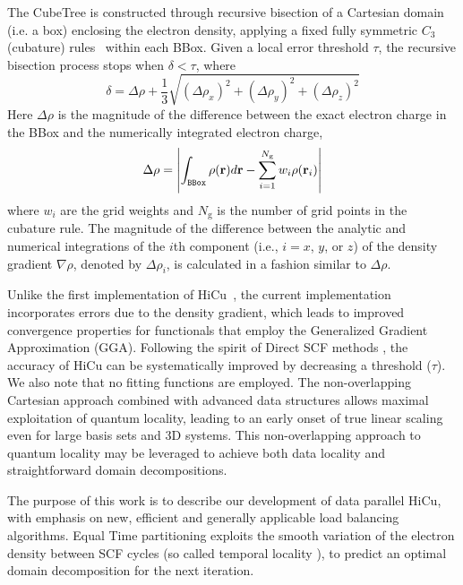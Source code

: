\commentoutA{\documentclass[prb,aps,twocolumn,twocolumngrid]{revtex4}}
\begin{document}
The CubeTree is constructed through recursive bisection of a Cartesian
domain (i.e. a box) enclosing the electron density, applying a fixed
fully symmetric $C_3$ (cubature) rules~\cite{Stroud71} within each
BBox.  Given a local error threshold $\tau$, the recursive bisection
process stops when $\delta < \tau$, where
\begin{equation}
\delta = \Delta \rho+ \frac{1}{3} \sqrt{(\Delta \rho_x)^2 + (\Delta
\rho_y)^2 + (\Delta \rho_z)^2}
\label{eq:delta}
\end{equation}
Here $\Delta \rho$ is the magnitude of the difference between the
exact electron charge in the BBox and the numerically integrated
electron charge,
\begin{equation}
\Delta \rho = \left|\int_{\tt{BBox}}\rho({\bf r}) d{\bf r} -
\sum_{i=1}^{N_{\mathrm{g}}} w_i\rho({\bf r}_i)\right|
\end{equation}
where $w_i$ are the grid weights and $N_{\mathrm{g}}$ is the number of
grid points in the cubature rule. The magnitude of the difference
between the analytic and numerical integrations of the $i$th component
(i.e., $i = x$, $y$, or $z$) of the density gradient $\nabla \rho$,
denoted by $\Delta \rho_i $, is calculated in a fashion similar to
$\Delta \rho$.

Unlike the first implementation of HiCu~\cite{MChallacombe00A}, the
current implementation incorporates errors due to the density
gradient, which leads to improved convergence properties for
functionals that employ the Generalized Gradient Approximation (GGA).
Following the spirit of Direct SCF methods \cite{JAlmlof82,MHaser89},
the accuracy of HiCu can be systematically improved by decreasing a
threshold ($\tau$).  We also note that no fitting functions are
employed. The non-overlapping Cartesian approach combined with
advanced data structures allows maximal exploitation of quantum
locality, leading to an early onset of true linear scaling even for
large basis sets and 3D systems.  This non-overlapping approach to
quantum locality may be leveraged to achieve both data locality and
straightforward domain decompositions.

The purpose of this work is to describe our development of data
parallel HiCu, with emphasis on new, efficient and generally
applicable load balancing algorithms.
Equal Time partitioning exploits the smooth variation of the electron
density between SCF cycles (so called temporal locality
\cite{JPilkington96}), to predict an optimal domain decomposition for
the next iteration.
\end{document}
